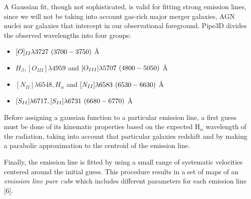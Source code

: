 A Gaussian fit, though not sophisticated, is valid for fitting strong emission lines, since we will not be taking into account
gas-rich major merger galaxies, AGN nuclei nor galaxies that intercept in our observational foreground. Pipe3D divides the observed
wavelengths into four groups:
\begin{itemize}
  \item $[O]_{II}\lambda 3727 \hspace*{2pt} \left(3700-3750\right)$ \AA
  \item $H_{\beta}, [O_{III}]\lambda 4959$ and $[O_{III}] \lambda5707 \hspace*{2pt} \left(4800-5050\right)$ \AA
  \item $[N_{II}] \lambda 6548, H_{\alpha}$ and $[N_{II}] \lambda 6583 \hspace*{2pt} \left(6530-6630\right)$ \AA
  \item $[S_{II}] \lambda 6717, [S_{II}] \lambda 6731 \hspace*{2pt} \left(6680-6770\right)$ \AA
\end{itemize}
Before assigning a gaussian function to a particular emission line, a first guess must be done of its kinematic properties based on
the expected H$_{\alpha}$ wavelength of the radiation, taking into account that particular galaxies redshift and by making a
parabolic approximation to the centroid of the emission line.

Finally, the emission line is fitted by using a small range of systematic velocities centered around the initial guess. This
procedure results in a set of maps of an \protect\textit{emission line pure cube} which includes different parameters for each
emission line [6].

